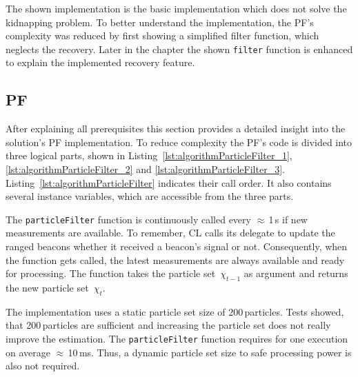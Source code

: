 The shown implementation is the basic implementation which does not solve the kidnapping problem. To better understand the implementation, the \acs{PF}'s complexity was reduced by first showing a simplified filter function, which neglects the recovery. Later in the chapter the shown \texttt{filter} function is enhanced to explain the implemented recovery feature.




\subsection{\acl{PF}}
After explaining all prerequisites this section provides a detailed insight into the solution's \acl{PF} implementation. To reduce complexity the \acs{PF}'s code is divided into three logical parts, shown in Listing~\ref{lst:algorithmParticleFilter_1}, \ref{lst:algorithmParticleFilter_2} and \ref{lst:algorithmParticleFilter_3}. Listing~\ref{lst:algorithmParticleFilter} indicates their call order. It also contains several instance variables, which are accessible from the three parts.

The \texttt{particleFilter} function is continuously called every $\approx$\,1\,s if new measurements are available. To remember, \ac{CL} calls its delegate to update the ranged beacons whether it received a beacon's signal or not. Consequently, when the function gets called, the latest measurements are always available and ready for processing. The function takes the particle set~$\chi_{t-1}$ as argument and returns the new particle set~$\chi_t$.

The implementation uses a static particle set size of 200\,particles. Tests showed, that 200\,particles are sufficient and increasing the particle set does not really improve the estimation. The \texttt{particleFilter} function requires for one execution on average $\approx$\,10\,ms. Thus, a dynamic particle set size to safe processing power is also not required.





